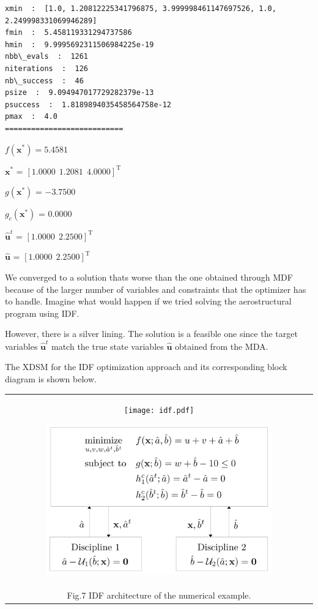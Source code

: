 \documentclass[11pt]{article}
\begin{document}
    \begin{Verbatim}[commandchars=\\\{\}]
xmin  :  [1.0, 1.20812225341796875, 3.999998461147697526, 1.0,
2.249998331069946289]
fmin  :  5.458119331294737586
hmin  :  9.9995692311506984225e-19
nbb\_evals  :  1261
niterations  :  126
nb\_success  :  46
psize  :  9.094947017729282379e-13
psuccess  :  1.8189894035458564758e-12
pmax  :  4.0
===========================
    \end{Verbatim}

    $f(\mathbf{x}^*) = 5.4581$

    
    $\mathbf{x}^*$ = $[1.0000~~1.2081~~4.0000]^\mathrm{T}$

    
    $g(\mathbf{x}^*)$ = $-3.7500$

    
    $g_c(\mathbf{x}^*)$ = $0.0000$

    
    $\hat{\mathbf{u}}^t$ = $[1.0000~~2.2500]^\mathrm{T}$

    
    $\hat{\mathbf{u}}$ = $[1.0000~~2.2500]^\mathrm{T}$

    
    We converged to a solution thats worse than the one obtained through MDF
because of the larger number of variables and constraints that the
optimizer has to handle. Imagine what would happen if we tried solving
the aerostructural program using IDF.

However, there is a silver lining. The solution is a feasible one since
the target variables \(\hat{\mathbf{u}}^t\) match the true state
variables \(\hat{\mathbf{u}}\) obtained from the MDA.

The XDSM for the IDF optimization approach and its corresponding block
diagram is shown below.

\begin{longtable}[]{@{}c@{}}
    \toprule
    \endhead
    \begin{minipage}[t]{0.97\columnwidth}\centering
        \begin{figure}
            \centering
            \texttt{[image: idf.pdf]}
        \end{figure}
        \begin{figure}
            \centering
            \includegraphics[width=0.9\textwidth]{images/IDF_diagram_numerical.png}
        \end{figure}
    \end{minipage}\tabularnewline
    Fig.7 IDF architecture of the numerical example.\tabularnewline
    \bottomrule
\end{longtable}
\end{document}
